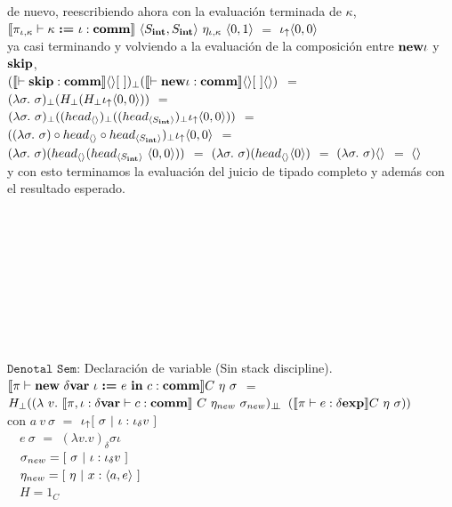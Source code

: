 de nuevo, reescribiendo ahora con la evaluaci\'on terminada de $\kappa$,\\

$\llbracket \pi_{\iota,\kappa} \vdash \kappa \ \textbf{:=} \ \iota: \textbf{comm} \rrbracket
		\ \langle S_{\textbf{int}},S_{\textbf{int}} \rangle \ \eta_{\iota,\kappa}
		\ \langle 0,1 \rangle$ $=$ $\iota_{\uparrow} \langle 0,0 \rangle$\\
		
ya casi terminando y volviendo a la evaluaci\'on de la composici\'on entre
$\textbf{new} \iota$ y $\textbf{skip}$, \\

$(\llbracket \vdash \textbf{skip} : \textbf{comm} \rrbracket\langle  \rangle[ \ ])_{\bot}
(\llbracket \vdash \textbf{new} \iota : \textbf{comm} \rrbracket\langle  \rangle[ \ ]\langle  \rangle)$
$=$\\
\indent 
$(\lambda \sigma . \ \sigma)_\bot (H_{\bot} (H_{\bot} \iota_{\uparrow} \langle 0,0 \rangle))$ $=$\\
\indent
$(\lambda \sigma . \ \sigma)_\bot 
	((head_{\langle  \rangle})_{\bot} ((head_{\langle S_{\textbf{int}} \rangle})_{\bot} \iota_{\uparrow} \langle 0,0 \rangle))$ $=$\\
\indent
$((\lambda \sigma . \ \sigma) \circ 
	head_{\langle  \rangle} \circ head_{\langle S_{\textbf{int}} \rangle})_{\bot} \iota_{\uparrow} \langle 0,0 \rangle$ $=$\\
\indent
$(\lambda \sigma . \ \sigma) (head_{\lrangles{}} (head_{\lrangles{S_\intt}} \ \lrangles{0,0}))$ $=$
$(\lambda \sigma . \ \sigma) (head_{\langle  \rangle} \langle 0 \rangle)$ $=$ 
$(\lambda \sigma . \ \sigma)\lrangles{}$ $=$ $\langle  \rangle$\\

y con esto terminamos la evaluaci\'on del juicio de tipado completo y adem\'as con 
el resultado esperado.

\

\

\

\

\

\noindent
$\texttt{Denotal Sem:}$ Declaraci\'on de variable (Sin stack discipline).\\

$\llbracket \pi \vdash \textbf{new} \ \delta \textbf{var} \ \iota \ \textbf{:=} \ e \ \textbf{in} \ c : \textbf{comm} \rrbracket C \ \eta \ \sigma$ 
$=$ \\ \indent \indent
$H_{\bot} ((\lambda \ v . \ \semBrcks{\pi,\iota:\deltavar \vdash c : \commt}
		\ C \ \eta_{new} \ \sigma_{new})_{\dbot}$
$(\semBrcks{\pi \vdash e : \deltaexp}C \ \eta \ \sigma))$\\

con 
$a \ v \ \sigma$ $=$ $\iota_{\uparrow} [ \ \sigma \ | \ \iota:\iota_{\delta} v \ ] $\\
\indent \indent \ \
$e \ \sigma$ $=$ $(\lambda v . v)_{\delta}\sigma \iota$\\
\indent \indent \ \
$\sigma_{new} = [ \ \sigma \ | \ \iota:\iotadelta v \ ]$\\
\indent \indent \ \
$\eta_{new} = [ \ \eta \ | \ x:\lrangles{a,e} \ ]$\\
\indent \indent \ \
$H = 1_C$\\
